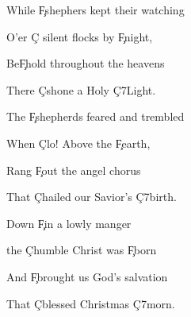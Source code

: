 \documentclass[9pt]{extarticle}
\begin{document}
\bsong

\bc
{}

\ec

\bv
While \c{F}shephers kept their watching

O'er \c{C} silent flocks by \c{F}night,

Be\c{F}hold throughout the heavens

There \c{C}shone a Holy \c{C7}Light.
\ev


\bv
The \c{F}shepherds feared and trembled

When \c{C}lo! Above the \c{F}earth,

Rang \c{F}out the angel chorus

That \c{C}hailed our Savior's \c{C7}birth.
\ev


\bv
Down \c{F}in a lowly manger

the \c{C}humble Christ was \c{F}born

And \c{F}brought us God's salvation

That \c{C}blessed Christmas \c{C7}morn.
\ev


\esong
\end{document}
